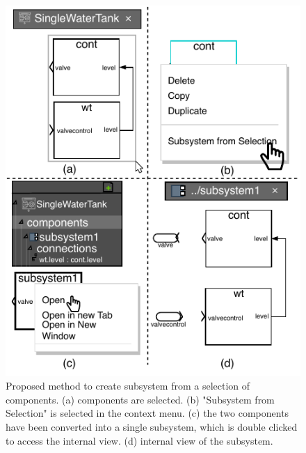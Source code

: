 \begin{figure}[bt]
\centering
\includegraphics[width=0.7\columnwidth]{Images/subsystems.pdf}
\caption{Proposed method to create subsystem from a selection of components. (a) components are selected. (b) "Subsystem from Selection" is selected in the context menu. (c) the two components have been converted into a single subsystem, which is double clicked to access the internal view. (d) internal view of the subsystem.}
\label{fig:subsystems}
\end{figure}
